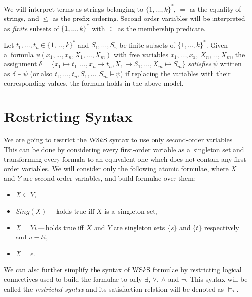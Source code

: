 We will interpret terms as strings belonging to $\{1,\ldots,k\}^*$, $=$ as the
equality of strings, and $\leq$ as the prefix ordering. Second order variables
will be interpreted as \emph{finite} subsets of $\{1,\ldots,k\}^*$ with
$\in$ as the membership predicate.
	
Let $t_1,\ldots,t_n \in \{1,\ldots,k\}^*$ and $S_1,\ldots,S_n$ be finite subsets
of $\{1,\ldots,k\}^*$. Given a~formula $\psi(x_1,\ldots,x_n,X_1,\ldots,X_m)$
with free variables $x_1,\ldots,x_n$, $X_n,\ldots,X_m$, the assignment $\delta =
\{ x_1 \mapsto t_1,\ldots, x_n \mapsto t_n, X_1 \mapsto S_1,\ldots, X_m \mapsto
S_m\}$ \emph{satisfies} $\psi$ written as $\delta \models \psi$ (or also
$t_1,\ldots, t_n, S_1,\ldots,S_m \models \psi$) if replacing the variables with
their corresponding values, the formula holds in the above model.
	
  \section{Restricting Syntax}\label{restricted}
	We are going to restrict the WS$k$S syntax to use only second-order variables.
	This can be done by considering every first-order variable as a~singleton set
	and transforming every formula to an equivalent one which does not contain any
	first-order variables. We will consider only the following atomic formulae,
	where $X$ and $Y$ are second-order variables, and build formulae over them:
	\begin{itemize}
	 \item $X \subseteq Y$,
\item $\mathit{Sing}(X)$\,---\,holds true iff $X$ is a~singleton set, \item $X
= Yi$\,---\,holds true iff $X$ and $Y$ are singleton sets $\{s\}$ and $\{t\}$
respectively and $s = ti$,
	 \item $X = \epsilon$.
	\end{itemize}
	
We can also further simplify the syntax of WS$k$S formulae by restricting
logical connectives used to build the formulae to only $\exists$, $\vee$,
$\wedge$ and $\neg$. This syntax will be called
the \emph{restricted syntax} and its satisfaction relation will be denoted as
$\models_2$.
	
